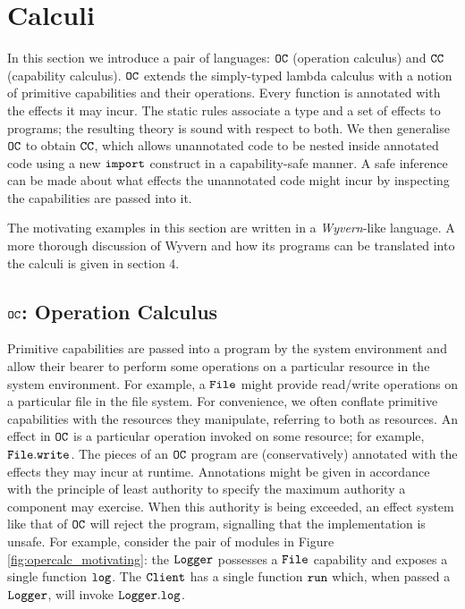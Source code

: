 
\section{Calculi}

In this section we introduce a pair of languages: $\mathtt{OC}$ (operation calculus) and $\mathtt{CC}$ (capability calculus). $\mathtt{OC}$ extends the simply-typed lambda calculus with a notion of primitive capabilities and their operations. Every function is annotated with the effects it may incur. The static rules associate a type and a set of effects to programs; the resulting theory is sound with respect to both. We then generalise $\mathtt{OC}$ to obtain $\mathtt{CC}$, which allows unannotated code to be nested inside annotated code using a new $\mathtt{import}$ construct in a capability-safe manner. A safe inference can be made about what effects the unannotated code might incur by inspecting the capabilities are passed into it.

The motivating examples in this section are written in a \textit{Wyvern}-like language. A more thorough discussion of Wyvern and how its programs can be translated into the calculi is given in section 4.

\subsection{$\mathtt{OC}$: Operation Calculus}

Primitive capabilities are passed into a program by the system environment and allow their bearer to perform some operations on a particular resource in the system environment. For example, a $\mathtt{File}$ might provide read/write operations on a particular file in the file system. For convenience, we often conflate primitive capabilities with the resources they manipulate, referring to both as resources. An effect in $\mathtt{OC}$ is a particular operation invoked on some resource; for example, $\mathtt{File.write}$. The pieces of an $\mathtt{OC}$ program are (conservatively) annotated with the effects they may incur at runtime. Annotations might be given in accordance with the principle of least authority to specify the maximum authority a component may exercise. When this authority is being exceeded, an effect system like that of $\mathtt{OC}$ will reject the program, signalling that the implementation is unsafe. For example, consider the pair of modules in Figure \ref{fig:opercalc_motivating}: the $\mathtt{Logger}$ possesses a $\mathtt{File}$ capability and exposes a single function $\mathtt{log}$. The $\mathtt{Client}$ has a single function $\mathtt{run}$ which, when passed a $\mathtt{Logger}$, will invoke $\mathtt{Logger.log}$.


